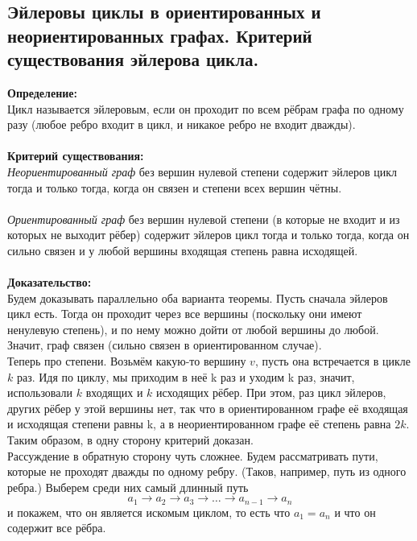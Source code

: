 \subsection{Эйлеровы циклы в ориентированных и неориентированных графах. Критерий существования эйлерова цикла.}
	
\textbf{Определение:} \\
Цикл называется эйлеровым, если он проходит по всем рёбрам графа по одному
разу (любое ребро входит в цикл, и никакое ребро не входит дважды).
\\ \\

\noindent \textbf{Критерий существования:} \\
\textit{Неориентированный граф} без вершин нулевой степени содержит эйлеров цикл тогда и только тогда, когда он связен и степени всех вершин чётны. \\ \\

\textit{Ориентированный граф} без вершин нулевой степени (в которые не
входит и из которых не выходит рёбер) содержит эйлеров цикл тогда и только
тогда, когда он сильно связен и у любой вершины входящая степень равна исходящей.	\\ \\ 

\noindent \textbf{Доказательство:} \\
\indent Будем доказывать параллельно оба варианта теоремы. Пусть сначала эйлеров цикл есть. Тогда он проходит через все вершины (поскольку они имеют ненулевую степень), и по нему можно дойти от любой вершины до любой. Значит, граф связен (сильно связен в ориентированном случае). \\

Теперь про степени. Возьмём какую-то вершину $v$, пусть она встречается в цикле
$k$ раз. Идя по циклу, мы приходим в неё k раз и уходим k раз, значит, использовали
$k$ входящих и $k$ исходящих рёбер. При этом, раз цикл эйлеров, других рёбер у этой
вершины нет, так что в ориентированном графе её входящая и исходящая степени
равны k, а в неориентированном графе её степень равна $2k$. Таким образом, в одну
сторону критерий доказан. \\ 

Рассуждение в обратную сторону чуть сложнее. Будем рассматривать пути, которые не проходят дважды по одному ребру. (Таков, например, путь из одного ребра.) Выберем среди них самый длинный путь
\[
a_1 \to a_2 \to a_3 \to \dots \to a_{n - 1} \to a_n
\]
и покажем, что он является искомым циклом, то есть что $a_1 = a_n$ и что он содержит
все рёбра. \\ 

